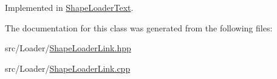 Implemented in \hyperlink{class_shape_loader_text_a7770dff8a2b7c942e2fdf5b5c15b5748}{Shape\+Loader\+Text}.



The documentation for this class was generated from the following files\+:\begin{DoxyCompactItemize}
\item 
src/\+Loader/\hyperlink{_shape_loader_link_8hpp}{Shape\+Loader\+Link.\+hpp}\item 
src/\+Loader/\hyperlink{_shape_loader_link_8cpp}{Shape\+Loader\+Link.\+cpp}\end{DoxyCompactItemize}
